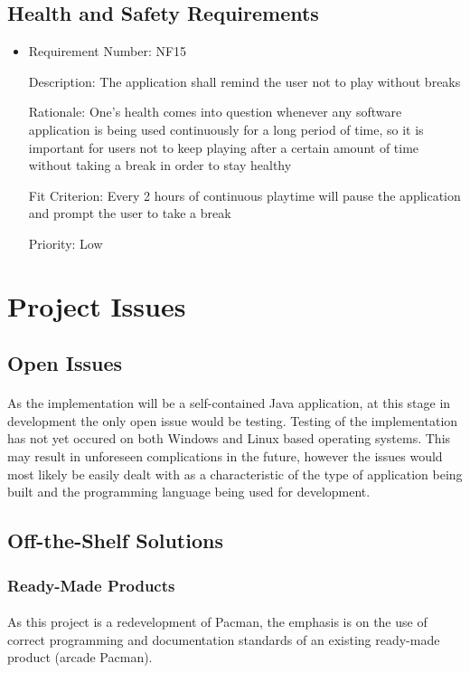 \documentclass[12pt, titlepage]{article}
\begin{document}
\subsection{Health and Safety Requirements}
\begin{itemize}
	\item
	Requirement Number: NF15

	Description: The application shall remind the user not to play without breaks

	Rationale: One's health comes into question whenever any software application is being used continuously for a long period of time, so it is important for users not to keep playing after a certain amount of time without taking a break in order to stay healthy

	Fit Criterion: Every 2 hours of continuous playtime will pause the application and prompt the user to take a break

	Priority: Low
\end{itemize}

\section{Project Issues}

\subsection{Open Issues}
\paragraph{}
As the implementation will be a self-contained Java application, at this stage in development the only open issue would be testing. Testing of the implementation has not yet occured on both Windows and Linux based operating systems. 
This may result in unforeseen complications in the future, however the issues would most likely be easily dealt with as a characteristic of the type of application being built and the programming language being used for development.

\subsection{Off-the-Shelf Solutions}

\subsubsection{Ready-Made Products}
\paragraph{}
As this project is a redevelopment of Pacman, the emphasis is on the use of correct programming and documentation standards of an existing ready-made product (arcade Pacman).
\end{document}
